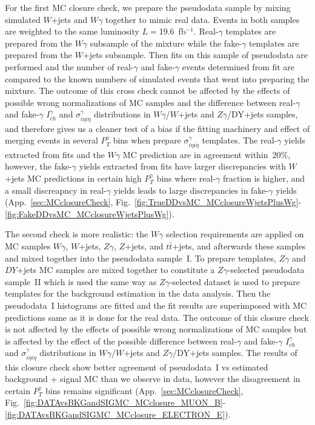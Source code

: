 For the first MC closure check, we prepare the pseudodata sample by mixing simulated $W$+jets and $W\gamma$ together to mimic real data. Events in both samples are weighted to the same luminosity $L=$19.6~fb$^{-1}$. Real-$\gamma$ templates are prepared from the $W\gamma$ subsample of the mixture while the fake-$\gamma$ templates are prepared from the $W$+jets subsample. Then fits on this sample of pseudodata are performed and the number of real-$\gamma$ and fake-$\gamma$ events determined from fit are compared to the known numbers of simulated events that went into preparing the mixture. The outcome of this cross check cannot be affected by the effects of possible wrong normalizations of MC samples and the difference between real-$\gamma$ and fake-$\gamma$ $I_{ch}^{\gamma}$ and $\sigma_{i\eta i\eta}^{\gamma}$ distributions in $W\gamma$/$W$+jets and $Z\gamma$/DY+jets samples, and therefore gives us a cleaner test of a bias if the fitting machinery and effect of merging events in several $P_T^{\gamma}$ bins when prepare $\sigma_{i\eta i\eta}^{\gamma}$ templates. The real-$\gamma$ yields extracted from fits and the $W\gamma$ MC prediction are in agreement within~20\%, however, the fake-$\gamma$ yields extracted from fits have larger discrepancies with $W$+jets MC predictions in certain high $P_T^{\gamma}$ bins where real-$\gamma$ fraction is higher, and a small discreapncy in real-$\gamma$ yields leads to large discrepancies in fake-$\gamma$ yields (App.~\ref{sec:MCclosureCheck}, Fig.~\ref{fig:TrueDDvsMC_MCclosureWjetsPlusWg}-\ref{fig:FakeDDvsMC_MCclosureWjetsPlusWg}).

The second check is more realistic: the $W\gamma$ selection requirements are applied on MC samples $W\gamma$, $W$+jets, $Z\gamma$, $Z$+jets, and $t\bar{t}$+jets, and afterwards these samples and mixed together into the pseudodata sample~I. To prepare templates, $Z\gamma$ and $DY$+jets MC samples are mixed together to constitute a $Z\gamma$-selected pseudodata sample~II which is used the same way as $Z\gamma$-selected dataset is used to prepare templates for the background estimation in the data analysis. Then the pseudodata~I histograms are fitted and the fit results are superimposed with MC predictions same as it is done for the real data. The outcome of this closure check is not affected by the effects of possible wrong normalizations of MC samples but is affected by the effect of the possible difference between real-$\gamma$ and fake-$\gamma$ $I_{ch}^{\gamma}$ and $\sigma_{i\eta i\eta}^{\gamma}$ distributions in $W\gamma$/$W$+jets and $Z\gamma$/DY+jets samples. The results of this closure check show better agreement of pseudodata~I vs estimated background + signal MC than we observe in data, however the disagreement in certain $P_T^{\gamma}$ bins remains significant (App.~\ref{sec:MCclosureCheck}, Fig.~\ref{fig:DATAvsBKGandSIGMC_MCclosure_MUON_B}-\ref{fig:DATAvsBKGandSIGMC_MCclosure_ELECTRON_E}).

